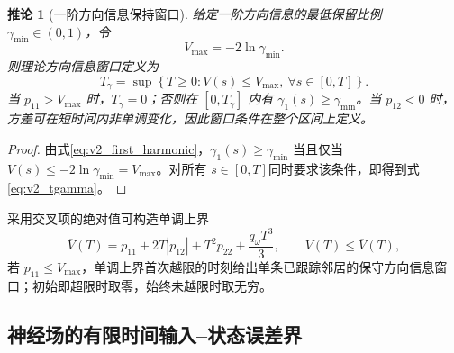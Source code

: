 \documentclass[UTF8,fontset=windows,11pt]{ctexart}
\newtheorem{corollary}[theorem]{推论}
\begin{document}
\begin{corollary}[一阶方向信息保持窗口]
\label{cor:v2_direction_window}
给定一阶方向信息的最低保留比例 $\gamma_{\min}\in(0,1)$，令
\begin{equation}
 V_{\max}=-2\ln\gamma_{\min}.
 \label{eq:v2_vmax}
\end{equation}
则理论方向信息窗口定义为
\begin{equation}
 T_\gamma=\sup\left\{T\ge0:
 V(s)\le V_{\max},\ \forall s\in[0,T]\right\}.
 \label{eq:v2_tgamma}
\end{equation}
当 $p_{11}>V_{\max}$ 时，$T_\gamma=0$；否则在 $[0,T_\gamma]$ 内有 $\gamma_1(s)\ge\gamma_{\min}$。当 $p_{12}<0$ 时，方差可在短时间内非单调变化，因此窗口条件在整个区间上定义。
\end{corollary}

\begin{proof}
由式\eqref{eq:v2_first_harmonic}，$\gamma_1(s)\ge\gamma_{\min}$ 当且仅当 $V(s)\le-2\ln\gamma_{\min}=V_{\max}$。对所有 $s\in[0,T]$同时要求该条件，即得到式\eqref{eq:v2_tgamma}。
\end{proof}

采用交叉项的绝对值可构造单调上界
\begin{equation}
 \overline V(T)=p_{11}+2T|p_{12}|+T^2p_{22}+\frac{q_\omega T^3}{3},
 \qquad V(T)\le\overline V(T),
 \label{eq:v2_vupper}
\end{equation}
若 $p_{11}\le V_{\max}$，单调上界首次越限的时刻给出单条已跟踪邻居的保守方向信息窗口；初始即超限时取零，始终未越限时取无穷。

\subsection{神经场的有限时间输入--状态误差界}
\end{document}
